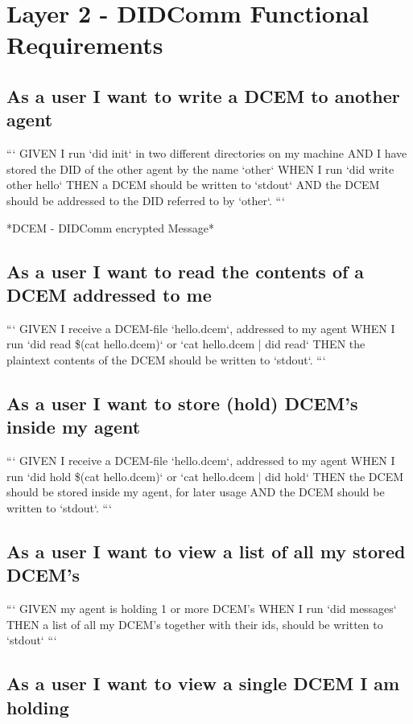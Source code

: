 \section{Layer 2 - DIDComm Functional Requirements}

\subsection{As a user I want to write a DCEM to another agent}

```
GIVEN I run `did init` in two different directories on my machine
AND   I have stored the DID of the other agent by the name `other`
WHEN  I run `did write other hello`
THEN  a DCEM should be written to `stdout`
AND   the DCEM should be addressed to the DID referred to by `other`.
```

*DCEM - DIDComm encrypted Message*

\subsection{As a user I want to read the contents of a DCEM addressed to me}

```
GIVEN I receive a DCEM-file `hello.dcem`, addressed to my agent
WHEN  I run `did read \$(cat hello.dcem)` or `cat hello.dcem | did read`
THEN  the plaintext contents of the DCEM should be written to `stdout`.
```

\subsection{As a user I want to store (hold) DCEM's inside my agent}

```
GIVEN I receive a DCEM-file `hello.dcem`, addressed to my agent
WHEN  I run `did hold \$(cat hello.dcem)` or `cat hello.dcem | did hold`
THEN  the DCEM should be stored inside my agent, for later usage
AND   the DCEM should be written to `stdout`.
```

\subsection{As a user I want to view a list of all my stored DCEM's}

```
GIVEN my agent is holding 1 or more DCEM's
WHEN  I run `did messages`
THEN  a list of all my DCEM's together with their ids, should be written to `stdout`
```

\subsection{As a user I want to view a single DCEM I am holding}

